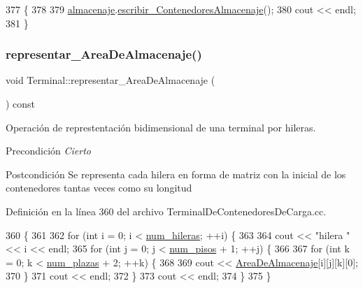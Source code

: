 \begin{DoxyCode}
377                                                      \{
378     
379     \hyperlink{class_terminal_a1d87d7b16c4f460eee6f1ab73da90fd2}{almacenaje}.\hyperlink{class_almacenaje_a5de7fa3a41e402feecac670c226a058f}{escribir\_ContenedoresAlmacenaje}();
380     cout << endl;
381 \}
\end{DoxyCode}
\mbox{\label{class_terminal_a32d375e8cecdafbbf0a291f646456dd6}} 
\subsubsection{\texorpdfstring{representar\+\_\+\+Area\+De\+Almacenaje()}{representar\_AreaDeAlmacenaje()}}
{\footnotesize\ttfamily void Terminal\+::representar\+\_\+\+Area\+De\+Almacenaje (\begin{DoxyParamCaption}{ }\end{DoxyParamCaption}) const}



Operación de represtentación bidimensional de una terminal por hileras. 

\begin{DoxyPrecond}{Precondición}
{\itshape Cierto} 
\end{DoxyPrecond}
\begin{DoxyPostcond}{Postcondición}
Se representa cada hilera en forma de matriz con la inicial de los contenedores tantas veces como su longitud 
\end{DoxyPostcond}


Definición en la línea 360 del archivo Terminal\+De\+Contenedores\+De\+Carga.\+cc.


\begin{DoxyCode}
360                                                   \{
361     
362     \textcolor{keywordflow}{for} (\textcolor{keywordtype}{int} i = 0; i < \hyperlink{class_terminal_a865c963b18aa837549dd637d439e8502}{num\_hileras}; ++i) \{
363         
364         cout << \textcolor{stringliteral}{"hilera "} << i << endl;
365         \textcolor{keywordflow}{for} (\textcolor{keywordtype}{int} j = 0; j < \hyperlink{class_terminal_ad6cdee7fe26b4443d45b0a18c345a86d}{num\_pisos} + 1; ++j) \{
366             
367             \textcolor{keywordflow}{for} (\textcolor{keywordtype}{int} k = 0; k < \hyperlink{class_terminal_a14265a71722ee28f3a50cee4a72e5607}{num\_plazas} + 2; ++k) \{
368                 
369                 cout << \hyperlink{class_terminal_a50670862a5cdeb0504efd1c45b6416dc}{AreaDeAlmacenaje}[i][j][k][0];
370             \}
371             cout << endl;
372         \}
373         cout << endl;
374     \}
375 \}
\end{DoxyCode}
\mbox{\label{class_terminal_afbfd7c045961e20718f9b5ffa1a31aa1}} 
